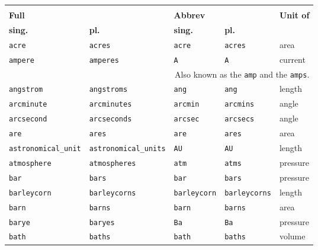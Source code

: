 \begin{landscape}
\begin{center}
\begin{longtable}{|lllll|}
\hline \endfoot
\hline
\multicolumn{4}{|l}{\bf Name} & \\
\multicolumn{2}{|l}{\bf Full} & \multicolumn{2}{l}{\bf Abbrev} & {\bf Unit of} \\
{\bf sing.} & {\bf pl.} & {\bf sing.} & {\bf pl.} & \\ \hline \endhead
{\tt\footnotesize acre} & {\tt\footnotesize acres} & {\tt\footnotesize acre} & {\tt\footnotesize acres} & area \\
{\tt\footnotesize ampere} & {\tt\footnotesize amperes} & {\tt\footnotesize A} & {\tt\footnotesize A} & current \\
\multicolumn{5}{|r|}{\footnotesize Also known as the {\tt amp} and the {\tt amps}.} \\
{\tt\footnotesize angstrom} & {\tt\footnotesize angstroms} & {\tt\footnotesize ang} & {\tt\footnotesize ang} & length \\
{\tt\footnotesize arcminute} & {\tt\footnotesize arcminutes} & {\tt\footnotesize arcmin} & {\tt\footnotesize arcmins} & angle \\
{\tt\footnotesize arcsecond} & {\tt\footnotesize arcseconds} & {\tt\footnotesize arcsec} & {\tt\footnotesize arcsecs} & angle \\
{\tt\footnotesize are} & {\tt\footnotesize ares} & {\tt\footnotesize are} & {\tt\footnotesize ares} & area \\
{\tt\footnotesize astronomical\_unit} & {\tt\footnotesize astronomical\_units} & {\tt\footnotesize AU} & {\tt\footnotesize AU} & length \\
{\tt\footnotesize atmosphere} & {\tt\footnotesize atmospheres} & {\tt\footnotesize atm} & {\tt\footnotesize atms} & pressure \\
{\tt\footnotesize bar} & {\tt\footnotesize bars} & {\tt\footnotesize bar} & {\tt\footnotesize bars} & pressure \\
{\tt\footnotesize barleycorn} & {\tt\footnotesize barleycorns} & {\tt\footnotesize barleycorn} & {\tt\footnotesize barleycorns} & length \\
{\tt\footnotesize barn} & {\tt\footnotesize barns} & {\tt\footnotesize barn} & {\tt\footnotesize barns} & area \\
{\tt\footnotesize barye} & {\tt\footnotesize baryes} & {\tt\footnotesize Ba} & {\tt\footnotesize Ba} & pressure \\
{\tt\footnotesize bath} & {\tt\footnotesize baths} & {\tt\footnotesize bath} & {\tt\footnotesize baths} & volume \\

\end{longtable}
\end{center}
\end{landscape}
